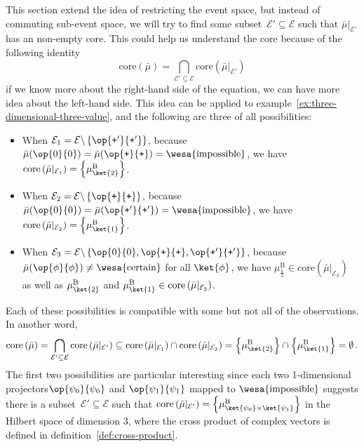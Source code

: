 \documentclass[12pt]{iopart}
\theoremstyle{plain}
\theoremstyle{definition}
\theoremstyle{remark}
\newcommand{\events}{\ensuremath{\mathcal{E}}}
\newcommand{\imposs}{{\mbox{\wesa{impossible}}}}
\newcommand{\necess}{{\mbox{\wesa{certain}}}}
\newcommand{\proj}[1]{\op{#1}{#1}}
\newcommand{\ps}{\texttt{+}}
\newcommand{\nb}{\nolinebreak[3] }
\begin{document}
This section extend the idea of restricting the event space, but instead
of commuting sub-event space, we will try to find some subset~$\events'\subseteq\events$
such that $\bar{\mu}|_{\events'}$ has an non-empty core. This could
help us understand the core because of the following identity
\begin{equation}
\mathrm{core}\left(\bar{\mu}\right)=\bigcap_{\events'\subseteq\events}\mathrm{core}\left(\bar{\mu}|_{\events'}\right)\label{eq:core-intersection}
\end{equation}
if we know more about the right-hand side of the equation, we can
have more idea about the left-hand side. This idea can be applied
to example~\ref{ex:three-dimensional-three-value}, and the following
are three of all possibilities:
\begin{itemize}
\item When $\events_{1}=\events\backslash\left\{ \proj{\ps'}\right\} $,
because $\bar{\mu}(\proj{0})=\bar{\mu}(\proj{\ps})=\imposs$, we have
$\mathrm{core}\left(\bar{\mu}|_{\events_{1}}\right)=\left\{ \mu_{\ket{2}}^{\mathrm{B}}\right\} $.
\item When $\events_{2}=\events\backslash\left\{ \proj{\ps}\right\} $,
because $\bar{\mu}(\proj{0})=\bar{\mu}(\proj{\ps'})=\imposs$, we
have $\mathrm{core}\left(\bar{\mu}|_{\events_{2}}\right)=\left\{ \mu_{\ket{1}}^{\mathrm{B}}\right\} $.
\item When $\events_{3}=\events\backslash\left\{ \proj{0},\proj{\ps},\proj{\ps'}\right\} $,
because $\bar{\mu}(\proj{\phi})\ne\necess$ for all $\ket{\phi}$,
we have $\mu_{\frac{\mathbb{1}}{3}}^{\mathrm{B}}\in\mathrm{core}\left(\bar{\mu}|_{\events_{3}}\right)$
as well as $\mu_{\ket{2}}^{\mathrm{B}}$ and $\mu_{\ket{1}}^{\mathrm{B}}\in\mathrm{core}\left(\bar{\mu}|_{\events_{3}}\right)$.
\end{itemize}
Each of these possibilities is compatible with some but not all of
the observations. In another word, 
\begin{equation}
\mathrm{core}\left(\bar{\mu}\right)=\bigcap_{\events'\subseteq\events}\mathrm{core}\left(\bar{\mu}|_{\events'}\right)\subseteq\mathrm{core}\left(\bar{\mu}|_{\events_{1}}\right)\cap\mathrm{core}\left(\bar{\mu}|_{\events_{2}}\right)=\left\{ \mu_{\ket{2}}^{\mathrm{B}}\right\} \cap\left\{ \mu_{\ket{1}}^{\mathrm{B}}\right\} =\emptyset\,.
\end{equation}
The first two possibilities are particular interesting since each
two 1-dimensional projectors\nb$\proj{\psi_{0}}$ and $\proj{\psi_{1}}$
mapped to $\imposs$ suggests there is a subset~$\events'\subseteq\events$
such that $\mathrm{core}\left(\bar{\mu}|_{\events'}\right)=\left\{ \mu_{\ket{\psi_{0}}\times\ket{\psi_{1}}}^{\mathrm{B}}\right\} $
in the Hilbert space of dimension 3, where the cross product of complex
vectors is defined in definition~\ref{def:cross-product}. 
\end{document}
